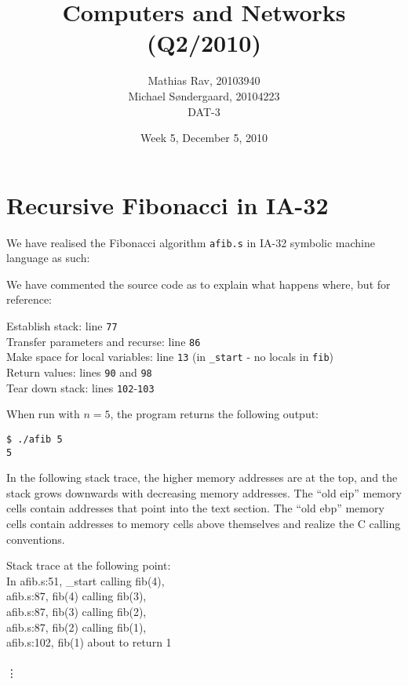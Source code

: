 \documentclass[12pt,a4paper]{article}
\title{Computers and Networks (Q2/2010)}
\author{Mathias Rav, 20103940 \\
		Michael Søndergaard, 20104223 \\
		DAT-3}
\date{Week 5, December 5, 2010}
\begin{document}
\maketitle

\section{Recursive Fibonacci in IA-32}
We have realised the Fibonacci algorithm \texttt{afib.s} in IA-32 symbolic machine language as such:



We have commented the source code as to explain what happens where, but for reference:

Establish stack: line \texttt{77} \\
Transfer parameters and recurse: line \texttt{86} \\
Make space for local variables: line \texttt{13} (in \texttt{\_start} - no locals in \texttt{fib}) \\
Return values: lines \texttt{90} and \texttt{98} \\
Tear down stack: lines \texttt{102}-\texttt{103}

When run with $n=5$, the program returns the following output:
\lstset{numbers=none}
\begin{lstlisting}
$ ./afib 5  
5
\end{lstlisting}


In the following stack trace, the higher memory addresses are at the top, and
the stack grows downwards with decreasing memory addresses. The ``old eip''
memory cells contain addresses that point into the text section. The ``old
ebp'' memory cells contain addresses to memory cells above themselves and
realize the C calling conventions.


Stack trace at the following point:   \\
In afib.s:51, \_start calling fib(4), \\
   afib.s:87, fib(4) calling fib(3),  \\
   afib.s:87, fib(3) calling fib(2),  \\
   afib.s:87, fib(2) calling fib(1),  \\
   afib.s:102, fib(1) about to return 1 \\
\\
   \vdots
\\
\end{document}
